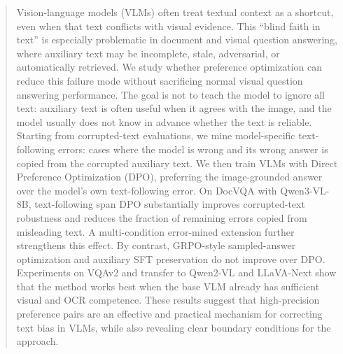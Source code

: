 \begin{abstract}
Vision-language models (VLMs) often treat textual context as a shortcut, even when that text conflicts with visual evidence.
This ``blind faith in text'' is especially problematic in document and visual question answering, where auxiliary text may be incomplete, stale, adversarial, or automatically retrieved.
We study whether preference optimization can reduce this failure mode without sacrificing normal visual question answering performance.
The goal is not to teach the model to ignore all text: auxiliary text is often useful when it agrees with the image, and the model usually does not know in advance whether the text is reliable.
Starting from corrupted-text evaluations, we mine model-specific text-following errors: cases where the model is wrong and its wrong answer is copied from the corrupted auxiliary text.
We then train VLMs with Direct Preference Optimization (DPO), preferring the image-grounded answer over the model's own text-following error.
On DocVQA with Qwen3-VL-8B, text-following span DPO substantially improves corrupted-text robustness and reduces the fraction of remaining errors copied from misleading text.
A multi-condition error-mined extension further strengthens this effect.
By contrast, GRPO-style sampled-answer optimization and auxiliary SFT preservation do not improve over DPO.
Experiments on VQAv2 and transfer to Qwen2-VL and LLaVA-Next show that the method works best when the base VLM already has sufficient visual and OCR competence.
These results suggest that high-precision preference pairs are an effective and practical mechanism for correcting text bias in VLMs, while also revealing clear boundary conditions for the approach.
\end{abstract}
